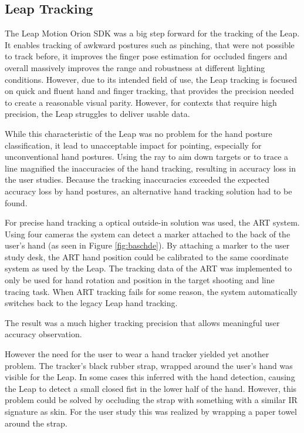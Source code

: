 \subsection{Leap Tracking}

The Leap Motion Orion SDK was a big step forward for the tracking of the Leap. It enables tracking of awkward postures such as pinching, that were not possible to track before, it improves the finger pose estimation for occluded fingers and overall massively improves the range and robustness at different lighting conditions. However, due to its intended field of use, the Leap tracking is focused on quick and fluent hand and finger tracking, that provides the precision needed to create a reasonable visual parity. However, for contexts that require high precision, the Leap struggles to deliver usable data. 

While this characteristic of the Leap was no problem for the hand posture classification, it lead to unacceptable impact for pointing, especially for unconventional hand postures. Using the ray to aim down targets or to trace a line magnified the inaccuracies of the hand tracking, resulting in accuracy loss in the user studies. Because the tracking inaccuracies exceeded the expected accuracy loss by hand postures, an alternative hand tracking solution had to be found.

For precise hand tracking a optical outside-in solution was used, the ART system. Using four cameras the system can detect a marker attached to the back of the user's hand (as seen in Figure \ref{fig:baschde}). By attaching a marker to the user study desk, the ART hand position could be calibrated to the same coordinate system as used by the Leap. The tracking data of the ART was implemented to only be used for hand rotation and position in the target shooting and line tracing task. When ART tracking fails for some reason, the system automatically switches back to the legacy Leap hand tracking.  

The result was a much higher tracking precision that allows meaningful user accuracy observation.  

However the need for the user to wear a hand tracker yielded yet another problem. The tracker's black rubber strap, wrapped around the user's hand was visible for the Leap. In some cases this inferred with the hand detection, causing the Leap to detect a small closed fist in the lower half of the hand. However, this problem could be solved by occluding the strap with something with a similar IR signature as skin. For the user study this was realized by wrapping a paper towel around the strap. 

